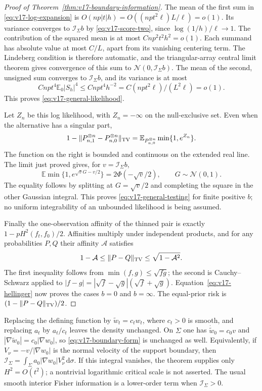 \begin{proof}[Proof of Theorem~\ref{thm:v17-boundary-information}]
The mean of the first sum in \eqref{eq:v17-log-expansion} is
$O(np|t|h)=O((np t^2\ell)L/\ell)=o(1)$. Its variance converges to
$\mathcal I_\Sigma b$ by \eqref{eq:v17-score-two}, since
$\log(1/h)/\ell\to1$. The contribution of the squared mean is at
most $Cnp^2t^2h^2=o(1)$. Each summand has absolute value at most
$C/L$, apart from its vanishing centering term. The Lindeberg condition
is therefore automatic, and the triangular-array central limit theorem
gives convergence of this sum to $\mathcal N(0,\mathcal I_\Sigma b)$.
The mean of the second, unsigned sum converges to
$\mathcal I_\Sigma b$, and its variance is at most
\[
       Cnp t^4\mathbb E_0|S_h|^4
             \le Cnp t^4h^{-2}=C(np t^2\ell)/(L^2\ell)=o(1).
\]
This proves \eqref{eq:v17-general-likelihood}.

Let $Z_n$ be this log likelihood, with $Z_n=-\infty$ on the
null-exclusive set. Even when the alternative has a singular part,
\[
 1-\|P_{n,1}^{\otimes n}-P_{n,0}^{\otimes n}\|_{\rm TV}
       =\mathbb E_{P_{n,0}^{\otimes n}}\min\{1,e^{Z_n}\}.
\]
The function on the right is bounded and continuous on the extended
real line. The limit just proved gives, for
$v=\mathcal I_\Sigma b$,
\[
 \mathbb E\min\{1,e^{\sqrt v G-v/2}\}=2\Phi(-\sqrt v/2),
                        \qquad G\sim\mathcal N(0,1).
\]
The equality follows by splitting at $G=\sqrt v/2$ and completing
the square in the other Gaussian integral. This proves
\eqref{eq:v17-general-testing} for finite positive $b$; no uniform
integrability of an unbounded likelihood is being assumed.

Finally the one-observation affinity of the thinned pair is exactly
$1-pH^2(f_t,f_0)/2$. Affinities multiply under independent products,
and for any probabilities $P,Q$ their affinity $\mathcal A$ satisfies
\[
             1-\mathcal A\le\|P-Q\|_{\rm TV}
                              \le\sqrt{1-\mathcal A^2}.
\]
The first inequality follows from $\min(f,g)\le\sqrt{fg}$; the
second is Cauchy--Schwarz applied to
$|f-g|=|\sqrt f-\sqrt g|(\sqrt f+\sqrt g)$.
Equation~\eqref{eq:v17-hellinger} now proves the cases $b=0$ and
$b=\infty$. The equal-prior risk is $(1-\|P-Q\|_{\rm TV})/2$.
\end{proof}

\begin{remark}
\label{rem:v17-invariance}
Replacing the defining function by $\widetilde w_t=c_t w_t$, where
$c_t>0$ is smooth, and replacing $a_t$ by $a_t/c_t$ leaves the density
unchanged. On $\Sigma$ one has
$\dot{\widetilde w}_0=c_0v$ and
$|\nabla\widetilde w_0|=c_0|\nabla w_0|$, so
\eqref{eq:v17-boundary-form} is unchanged as well. Equivalently, if
$V_\nu=-v/|\nabla w_0|$ is the normal velocity of the support boundary,
then $\mathcal I_\Sigma=\int_\Sigma a_0|\nabla w_0|V_\nu^2\,
\mathrm d\sigma$. If this integral vanishes, the theorem supplies only
$H^2=O(t^2)$; a nontrivial logarithmic critical scale is not asserted.
The usual smooth interior Fisher information is a lower-order term
when $\mathcal I_\Sigma>0$.
\end{remark}
